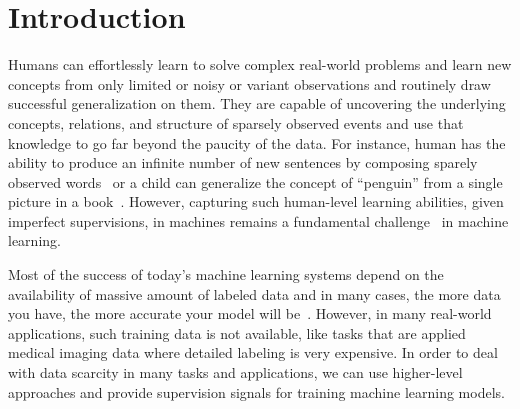 \chapter{Introduction}
%
\begin{quote}
\end{quote}
%
Humans can effortlessly learn to solve complex real-world problems and learn new concepts from only limited or noisy or variant observations and routinely draw successful generalization on them. They are capable of uncovering the underlying concepts, relations, and structure of sparsely observed events and use that knowledge to go far beyond the paucity of the data.
For instance, human has the ability to produce an infinite number of new sentences by composing sparely observed words~\citep{lake2017building} or a child can generalize the concept of ``penguin'' from a single picture in a book~\citep{vinyals2016matching}. 
However, capturing such human-level learning abilities, given imperfect supervisions, in machines remains a fundamental challenge~\citep{lake2017building} in machine learning.


Most of the success of today's machine learning systems depend on the availability of massive amount of labeled data and in many cases, the more data you have, the more accurate your model will be~\citep{halevy2009unreasonable,sun2017revisiting}. 
However, in many real-world applications, such training data is not available, like tasks that are applied medical imaging data where detailed labeling is very expensive. In order to deal with data scarcity in many tasks and applications, we can use higher-level approaches and provide supervision signals for training machine learning models. 

